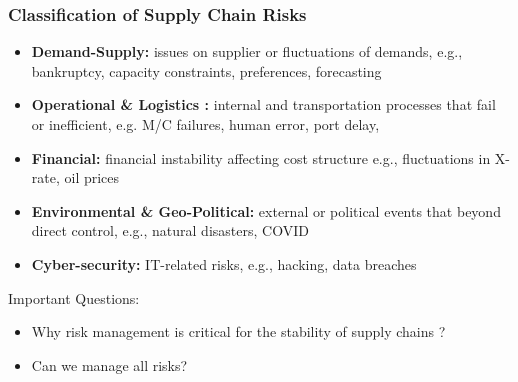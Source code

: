 \documentclass[10pt,presentation]{beamer}
\begin{document}
\begin{frame}
\end{frame}

\begin{frame}
  \frametitle{Classification of Supply Chain Risks}

  \begin{itemize}
    \item \textbf{Demand-Supply:} issues on supplier or fluctuations of demands, e.g., bankruptcy, capacity constraints, preferences, forecasting
    \item \textbf{Operational \& Logistics :} \alert{internal} and transportation \alert{processes} that fail or inefficient, e.g. M/C failures, human error, port delay,
    \item \textbf{Financial:} financial instability affecting cost structure e.g., fluctuations in X-rate, oil prices
    \item \textbf{Environmental \& Geo-Political:}  \alert{external} or political events that beyond direct control, e.g., natural disasters, COVID
    \item \textbf{Cyber-security:} IT-related risks, e.g., hacking, data breaches
  \end{itemize}

  \NextLine
  \begin{block}{\small{Important Questions:} } \small{
    \begin{itemize}
      \item Why risk management is critical for the stability of supply chains ?
      \item Can we manage all risks?
    \end{itemize} }
  \end{block}


\end{frame}
\end{document}

